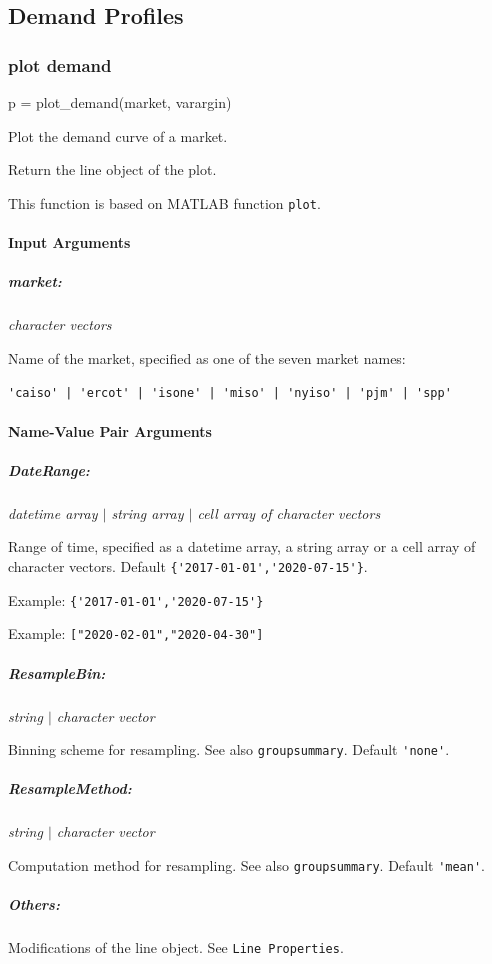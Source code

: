\documentclass[11pt]{article}
\newcommand{\matlab}{\textsc{MATLAB}}
\numberwithin{equation}{section}
\numberwithin{table}{section}
\numberwithin{figure}{section}
\begin{document}
\subsection{Demand Profiles}
\subsubsection{plot demand}
\begin{Code}
  p = plot_demand(market, varargin)
\end{Code}

Plot the demand curve of a market.

Return the line object of the plot.

This function is based on \matlab{} function \verb!plot!.


\paragraph{Input Arguments}
\subparagraph{market:} \textit{character vectors}

Name of the market, specified as one of the seven market names:

\verb!'caiso' | 'ercot' | 'isone' | 'miso' | 'nyiso' | 'pjm' | 'spp'!

\paragraph{Name-Value Pair Arguments}
\subparagraph{DateRange:} \textit{datetime array $|$ string array $|$ cell array of character vectors}

Range of time, specified as a datetime array, a string array or a cell array of character vectors. Default \verb!{'2017-01-01','2020-07-15'}!.

Example: \verb!{'2017-01-01','2020-07-15'}!

Example: \verb!["2020-02-01","2020-04-30"]!

\subparagraph{ResampleBin:} \textit{string $|$ character vector}

Binning scheme for resampling. See also \verb!groupsummary!. Default \verb!'none'!.

\subparagraph{ResampleMethod:} \textit{string $|$ character vector}

Computation method for resampling. See also \verb!groupsummary!. Default \verb!'mean'!.

\subparagraph{Others:}

Modifications of the line object. See \verb!Line Properties!.
\end{document}
